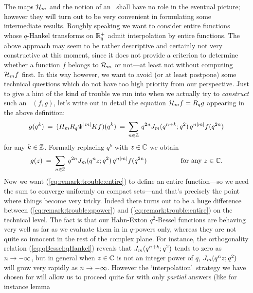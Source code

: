 \begin{remark} \label{rem:not_constructive} \rm
The maps ${\mathcal H}_{m}$ and the notion of an \Hmpair\ shall have no
role in the eventual picture; however they will turn out to be
very convenient in formulating some intermediate results. Roughly
speaking we want to consider entire functions whose $q$-Hankel
transforms on $\mathbb{R}_q^+$ admit interpolation by entire functions.
The above approach may seem to be rather descriptive and certainly
not very constructive at this moment, since it does not provide a
criterion to determine whether a function $f$ belongs to
${\mathcal R}_{m}$ or not---at least not without computing ${\mathcal H}_{m} f$
first. In this way however, we want to avoid (or at least
postpone) some technical questions which do not have too high
priority from our perspective. Just to give a hint of the kind of
trouble we run into when we actually try to {\em construct\/}
such an \Hmpair\ $(f,g)$, let's write out in detail the equation
${\mathcal H}_{m} f = R_q g$ appearing in the above definition:
\begin{equation}\label{eq:remark:trouble:qpower}
 g(q^k) \:=\: (H_m R_q \Psi^{|m|} K f)(q^k)
        \:=\:  \sum_{n\in \mathbb{Z}} \: q^{2n} J_{m}(q^{n+k}; q^2)\, q^{n|m|} f(q^{2n})
\end{equation}
for any $k\in\mathbb{Z}$. Formally replacing $q^k$ with $z\in\mathbb{C}$ we obtain
\begin{equation}\label{eq:remark:trouble:entire}
   g(z)  \:=\;  \sum_{n\in \mathbb{Z}} \: q^{2n} J_{m}(q^n z; q^2)\, q^{n|m|} f(q^{2n})
     \hspace{5em} \mbox{for any $z\in\mathbb{C}$}.
\end{equation}
Now we want (\ref{eq:remark:trouble:entire}) to define an entire
function---so we need the sum to converge uniformly on
compact sets---and that's precisely the point where things become very tricky.
Indeed there turns out to be a huge difference between
(\ref{eq:remark:trouble:qpower}) and (\ref{eq:remark:trouble:entire})
on the technical level. The fact is that our Hahn-Exton $q^2$-Bessel
functions are behaving very well as far as we evaluate them in in $q$-powers only,
whereas they are not quite so innocent in the rest of the complex plane.
For instance, the orthogonality relation (\ref{eq:qBessel:qHankel})
reveals that $J_{m}(q^{n+k}; q^2)$ tends to zero as $n \rightarrow -\infty$, but in general
when $z\in \mathbb{C}$ is not an integer power of $q$, $J_{m}(q^n z; q^2)$ will grow very
rapidly as $n \rightarrow -\infty$.
However the \lq interpolation\rq\ strategy we have chosen for will allow us to
proceed quite far with only {\em partial\/} answers (like for instance lemma

\end{remark}
